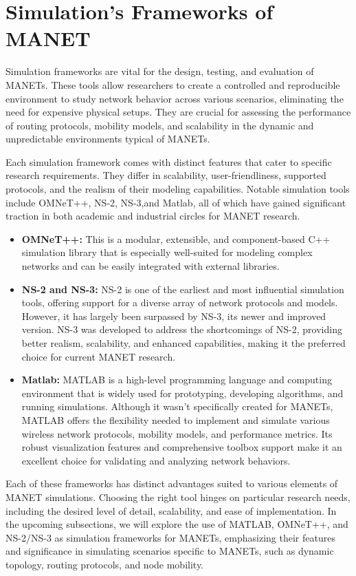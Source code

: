 \documentclass[]{nsm-thesis}
\begin{document}
\section{Simulation's Frameworks of MANET}
Simulation frameworks are vital for the design, testing, and evaluation of MANETs. These tools allow researchers to create a controlled and reproducible environment to study network behavior across various scenarios, eliminating the need for expensive physical setups. They are crucial for assessing the performance of routing protocols, mobility models, and scalability in the dynamic and unpredictable environments typical of MANETs.

Each simulation framework comes with distinct features that cater to specific research requirements. They differ in scalability, user-friendliness, supported protocols, and the realism of their modeling capabilities. Notable simulation tools include OMNeT++, NS-2,  NS-3,and Matlab, all of which have gained significant traction in both academic and industrial circles for MANET research.
\begin{itemize}
    \item \textbf{OMNeT++:} This is a modular, extensible, and component-based C++ simulation library that is especially well-suited for modeling complex networks and can be easily integrated with external libraries. \cite{omnetpp}
    \item \textbf{NS-2 and NS-3:} NS-2 is one of the earliest and most influential simulation tools, offering support for a diverse array of network protocols and models. However, it has largely been surpassed by NS-3, its newer and improved version. NS-3 was developed to address the shortcomings of NS-2, providing better realism, scalability, and enhanced capabilities, making it the preferred choice for current MANET research.\cite{10.1145/1878537.1878651}
    \item \textbf{Matlab:} MATLAB is a high-level programming language and computing environment that is widely used for prototyping, developing algorithms, and running simulations. Although it wasn't specifically created for MANETs, MATLAB offers the flexibility needed to implement and simulate various wireless network protocols, mobility models, and performance metrics. Its robust visualization features and comprehensive toolbox support make it an excellent choice for validating and analyzing network behaviors.\cite{mathworks_wireless_network}

    
\end{itemize}
Each of these frameworks has distinct advantages suited to various elements of MANET simulations. Choosing the right tool hinges on particular research needs, including the desired level of detail, scalability, and ease of implementation. In the upcoming subsections, we will explore the use of MATLAB, OMNeT++, and NS-2/NS-3 as simulation frameworks for MANETs, emphasizing their features and significance in simulating scenarios specific to MANETs, such as dynamic topology, routing protocols, and node mobility.
\end{document}
